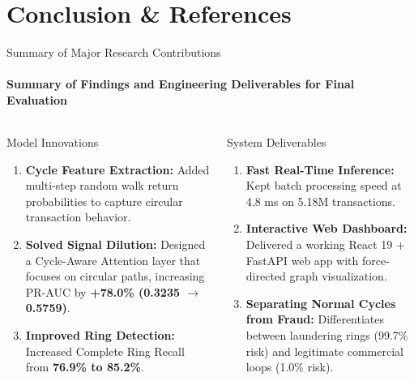 \documentclass[aspectratio=169, 11pt]{beamer}
\begin{document}
\section{Conclusion \& References}

\begin{frame}{Summary of Major Research Contributions}
    \framesubtitle{Summary of Findings and Engineering Deliverables for Final Evaluation}
    \begin{columns}[T]
        \begin{block}{Model Innovations}
            \footnotesize
            \begin{enumerate}\setlength{\itemsep}{3pt}
                \item \textbf{Cycle Feature Extraction:} Added multi-step random walk return probabilities to capture circular transaction behavior.
                \item \textbf{Solved Signal Dilution:} Designed a Cycle-Aware Attention layer that focuses on circular paths, increasing PR-AUC by \textbf{+78.0\% (0.3235 $\to$ 0.5759)}.
                \item \textbf{Improved Ring Detection:} Increased Complete Ring Recall from \textbf{76.9\% to 85.2\%}.
            \end{enumerate}
        \end{block}

        \begin{block}{System Deliverables}
            \footnotesize
            \begin{enumerate}\setlength{\itemsep}{3pt}
                \item \textbf{Fast Real-Time Inference:} Kept batch processing speed at 4.8 ms on 5.18M transactions.
                \item \textbf{Interactive Web Dashboard:} Delivered a working React 19 + FastAPI web app with force-directed graph visualization.
                \item \textbf{Separating Normal Cycles from Fraud:} Differentiates between laundering rings (99.7\% risk) and legitimate commercial loops (1.0\% risk).
            \end{enumerate}
        \end{block}
    \end{columns}
\end{frame}
\end{document}
